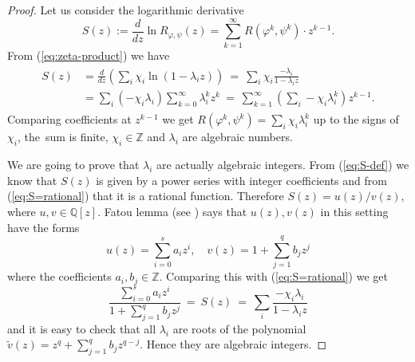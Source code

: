 \documentclass[12pt, a4paper]{amsart}
\def\Z{{\mathbb Z}}
\def\Q{{\mathbb Q}}
\def\ln{\operatorname{ln}}
\begin{document}
\begin{proof}
  Let us consider the logarithmic derivative
  \begin{equation}\label{eq:S-def}
    S(z) := \frac{d}{dz} \ln R_{\varphi, \psi}(z) = \sum_{k=1}^\infty R(\varphi^k, \psi^k) \cdot z^{k-1}.
  \end{equation}
  From (\ref{eq:zeta-product}) we have
  \begin{align}\label{eq:S=rational}
  \begin{split}
    S(z) &= \frac{d}{dz} \left( \sum_i \chi_i \ln(1-\lambda_i z) \right)
    \ = \ \sum_i \chi_i \frac{-\lambda_i}{1-\lambda_i z} \\
    &= \sum_i (-\chi_i \lambda_i) \sum_{k=0}^\infty \lambda_i^k z^k
    \ = \ \sum_{k=1}^\infty \left( \sum_i -\chi_i \lambda_i^k \right) z^{k-1}.
  \end{split}
  \end{align}
  Comparing coefficients at $z^{k-1}$ we get $R(\varphi^k, \psi^k) = \sum_i \chi_i \lambda_i^k$
  up to the signs of $\chi_i$,
  the~sum is finite, $\chi_i \in \Z$ and $\lambda_i$ are algebraic numbers.

  We are going to prove that $\lambda_i$ are actually algebraic integers.
  From (\ref{eq:S-def}) we know that $S(z)$ is given by a power series with integer coefficients
  and from (\ref{eq:S=rational}) that it is a rational function.
  Therefore $S(z) = u(z) / v(z)$, where $u, v \in \Q[z]$.
  Fatou lemma (see \cite[Lemma~3.1.31]{JezMar}) says that $u(z), v(z)$ in this setting have the forms
  \[
    u(z) = \sum_{i=0}^s a_i z^i, \quad v(z) = 1 + \sum_{j=1}^q b_j z^j
  \]
  where the coefficients $a_i, b_j \in \Z$.
  Comparing this with (\ref{eq:S=rational}) we get
  \[
    \frac{\sum_{i=0}^s a_i z^i}{1 + \sum_{j=1}^q b_j z^j} \ = \ S(z) \
    = \ \sum_i \frac{-\chi_i\lambda_i}{1-\lambda_i z}
  \]
  and it is easy to check that all $\lambda_i$ are roots of the polynomial
  $\tilde{v}(z) = z^q + \sum_{j=1}^q b_j z^{q-j}$.
  Hence they are algebraic integers.
\end{proof}
\end{document}
